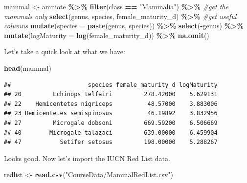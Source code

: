\documentclass[
  a4paperpaper,
]{book}
\newenvironment{Shaded}{\begin{snugshade}}{\end{snugshade}}
\newcommand{\CommentTok}[1]{\textcolor[rgb]{0.56,0.35,0.01}{\textit{#1}}}
\newcommand{\DataTypeTok}[1]{\textcolor[rgb]{0.13,0.29,0.53}{#1}}
\newcommand{\KeywordTok}[1]{\textcolor[rgb]{0.13,0.29,0.53}{\textbf{#1}}}
\newcommand{\NormalTok}[1]{#1}
\newcommand{\OperatorTok}[1]{\textcolor[rgb]{0.81,0.36,0.00}{\textbf{#1}}}
\newcommand{\StringTok}[1]{\textcolor[rgb]{0.31,0.60,0.02}{#1}}
\begin{document}
\begin{Shaded}
\begin{Highlighting}[]
\NormalTok{mammal \textless{}{-}}\StringTok{ }\NormalTok{amniote }\OperatorTok{\%\textgreater{}\%}
\StringTok{  }\KeywordTok{filter}\NormalTok{(class }\OperatorTok{==}\StringTok{ "Mammalia"}\NormalTok{) }\OperatorTok{\%\textgreater{}\%}\StringTok{ }\CommentTok{\#get the mammals only}
\StringTok{  }\KeywordTok{select}\NormalTok{(genus, species, female\_maturity\_d) }\OperatorTok{\%\textgreater{}\%}\StringTok{ }\CommentTok{\#get useful columns }
\StringTok{  }\KeywordTok{mutate}\NormalTok{(}\DataTypeTok{species =} \KeywordTok{paste}\NormalTok{(genus, species)) }\OperatorTok{\%\textgreater{}\%}
\StringTok{  }\KeywordTok{select}\NormalTok{(}\OperatorTok{{-}}\NormalTok{genus) }\OperatorTok{\%\textgreater{}\%}
\StringTok{  }\KeywordTok{mutate}\NormalTok{(}\DataTypeTok{logMaturity =} \KeywordTok{log}\NormalTok{(female\_maturity\_d)) }\OperatorTok{\%\textgreater{}\%}
\StringTok{  }\KeywordTok{na.omit}\NormalTok{()}
\end{Highlighting}
\end{Shaded}

Let's take a quick look at what we have:

\begin{Shaded}
\begin{Highlighting}[]
\KeywordTok{head}\NormalTok{(mammal)}
\end{Highlighting}
\end{Shaded}

\begin{verbatim}
##                      species female_maturity_d logMaturity
## 20         Echinops telfairi         278.42000    5.629131
## 22    Hemicentetes nigriceps          48.57000    3.883006
## 23 Hemicentetes semispinosus          46.19892    3.832956
## 27         Microgale dobsoni         669.59200    6.506669
## 40        Microgale talazaci         639.00000    6.459904
## 47           Setifer setosus         198.00000    5.288267
\end{verbatim}

Looks good. Now let's import the IUCN Red List data.

\begin{Shaded}
\begin{Highlighting}[]
\NormalTok{redlist \textless{}{-}}\StringTok{ }\KeywordTok{read.csv}\NormalTok{(}\StringTok{"CourseData/MammalRedList.csv"}\NormalTok{)}
\end{Highlighting}
\end{Shaded}
\end{document}
